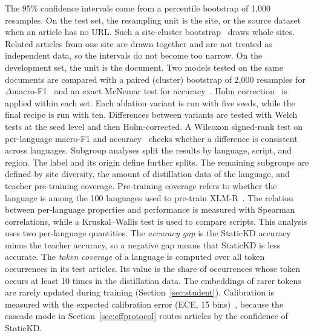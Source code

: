 \documentclass[journal]{IEEEtran}
\begin{document}
The 95\% confidence intervals come from a percentile bootstrap of 1,000 resamples. On the test set, the resampling unit is the site, or the source dataset when an article has no URL. Such a site-cluster bootstrap~\cite{field2007bootstrapping} draws whole sites. Related articles from one site are drawn together and are not treated as independent data, so the intervals do not become too narrow. On the development set, the unit is the document. Two models tested on the same documents are compared with a paired (cluster) bootstrap of 2,000 resamples for $\Delta$macro-F1~\cite{koehn2004significance} and an exact McNemar test for accuracy~\cite{mcnemar1947}. Holm correction~\cite{holm1979} is applied within each set. Each ablation variant is run with five seeds, while the final recipe is run with ten. Differences between variants are tested with Welch tests at the seed level and then Holm-corrected. A Wilcoxon signed-rank test on per-language macro-F1 and accuracy~\cite{dror2018hitchhiker} checks whether a difference is consistent across languages. Subgroup analyses split the results by language, script, and region. The label and its origin define further splits. The remaining subgroups are defined by site diversity, the amount of distillation data of the language, and teacher pre-training coverage. Pre-training coverage refers to whether the language is among the 100 languages used to pre-train XLM-R~\cite{conneau2020xlmr}. The relation between per-language properties and performance is measured with Spearman correlations, while a Kruskal--Wallis test is used to compare scripts. This analysis uses two per-language quantities. The \emph{accuracy gap} is the StaticKD accuracy minus the teacher accuracy, so a negative gap means that StaticKD is less accurate. The \emph{token coverage} of a language is computed over all token occurrences in its test articles. Its value is the share of occurrences whose token occurs at least 10 times in the distillation data. The embeddings of rarer tokens are rarely updated during training (Section~\ref{sec:student}). Calibration is measured with the expected calibration error (ECE, 15 bins)~\cite{guo2017calibration}, because the cascade mode in Section~\ref{sec:effprotocol} routes articles by the confidence of StaticKD.
\end{document}

